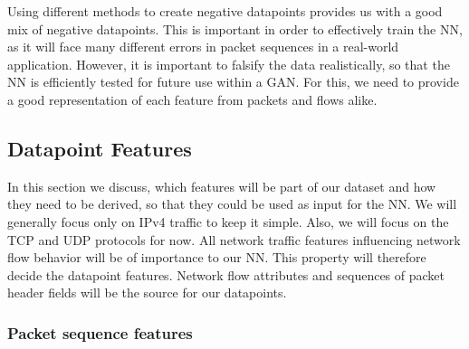 \documentclass[
	ngerman,
	ruledheaders=section,%
	class=report,%
	thesis={type=bachelor},%
	accentcolor=9c,%
	custommargins=true,%
	marginpar=false,%
	parskip=half-,%
	fontsize=11pt,%
	twoside
]{tudapub}
\begin{document}
Using different methods to create negative datapoints provides us with a good mix of negative datapoints.
This is important in order to effectively train the NN, as it will face many different errors in packet sequences in a real-world application.
However, it is important to falsify the data realistically, so that the NN is efficiently tested for future use within a GAN.
For this, we need to provide a good representation of each feature from packets and flows alike.

\subsection{Datapoint Features}
\label{sec:datapointFeatures}

In this section we discuss, which features will be part of our dataset and how they need to be derived, so that they could be used as input for the NN.
We will generally focus only on IPv4 traffic to keep it simple.
Also, we will focus on the TCP and UDP protocols for now.
All network traffic features influencing network flow behavior will be of importance to our NN.
This property will therefore decide the datapoint features.
Network flow attributes and sequences of packet header fields will be the source for our datapoints.


\subsubsection{Packet sequence features}
\label{sec:packtFeatures}

\end{document}

